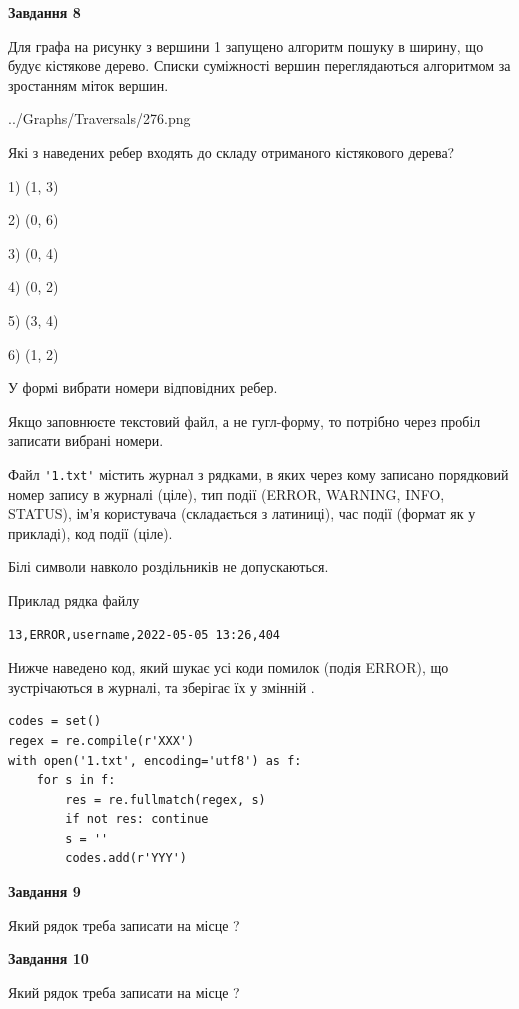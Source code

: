 \documentclass[12pt, ukrainian]{article}
\def\code#1{\Verb!#1!}
\begin{document}
{\begin {large}
{\begin {center}\textbf{Завдання 8}\end {center}}\par
Для графа на рисунку з вершини 1 запущено алгоритм пошуку в ширину, що будує кістякове дерево. Списки суміжності вершин переглядаються алгоритмом за зростанням міток вершин.\par
\begin{center}
	{../Graphs/Traversals/276.png}
\end{center}
\par Які з наведених ребер входять до складу отриманого кістякового дерева?\par
1) (1, 3)\par
2) (0, 6)\par
3) (0, 4)\par
4) (0, 2)\par
5) (3, 4)\par
6) (1, 2)\par
{\vskip 15pt} У формі вибрати номери відповідних ребер.


Якщо заповнюєте текстовий файл, а не гугл-форму, то потрібно через пробіл записа\-ти вибрані номери.\par
\newpage


Файл \code{'1.txt'} містить журнал з рядками, в яких через кому записано поряд\-ко\-вий номер запису в журналі (ціле), тип події (ERROR, WARNING, INFO, STATUS), ім'я користувача (складається з латиниці), час події (фор\-мат як у прикладі), код події (ціле).

Білі символи навколо роздільників не допускаються.

Приклад рядка файлу



\begin{verbatim}
13,ERROR,username,2022-05-05 13:26,404
\end{verbatim}


Нижче наведено код, який шукає усі коди помилок (подія ERROR), що зустріча\-ють\-ся в журналі, та зберігає їх у змінній .



\begin{verbatim}
codes = set()
regex = re.compile(r'XXX')
with open('1.txt', encoding='utf8') as f:
    for s in f:
        res = re.fullmatch(regex, s)
        if not res: continue
        s = ''
        codes.add(r'YYY')
\end{verbatim}


{\begin {center}\textbf{Завдання 9}\end {center}}\par
Який рядок треба записати на місце  ?\par
\vspace{5mm}


{\begin {center}\textbf{Завдання 10}\end {center}}\par
Який рядок треба записати на місце  ?\par


\newpage


\end {large}}
\end{document}
